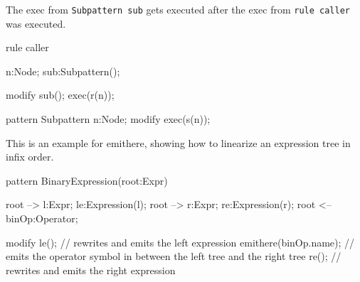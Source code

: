 \begin{example}
	The exec from \texttt{Subpattern sub} gets executed after the exec from \texttt{rule caller} was executed.
	\begin{grgen}
rule caller
{
  n:Node;
  sub:Subpattern();

  modify {
    sub();
    exec(r(n));
  }
}
pattern Subpattern
{
  n:Node;
  modify {
    exec(s(n));
  }
}
	\end{grgen}
\end{example}

\begin{example}
	This is an example for emithere, showing how to linearize an expression tree in infix order.
	\begin{grgen}
pattern BinaryExpression(root:Expr)
{
  root --> l:Expr; le:Expression(l);
  root --> r:Expr; re:Expression(r);
  root <-- binOp:Operator;

  modify {
    le(); // rewrites and emits the left expression
    emithere(binOp.name); // emits the operator symbol in between the left tree and the right tree
    re(); // rewrites and emits the right expression
  }
}
	\end{grgen}
\end{example}


